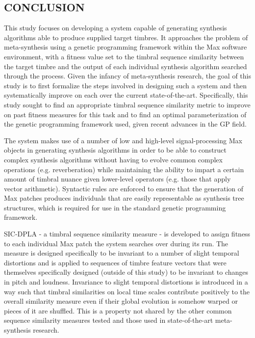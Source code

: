 \documentclass[12pt]{report} 	%
\numberwithin{figure}{chapter}
\numberwithin{table}{chapter}
\numberwithin{equation}{chapter}
\begin{document}
\begin{flushleft}
\vspace*{\QuarterPage}
\chapter{CONCLUSION} %
This study focuses on developing a system capable of generating synthesis algorithms able to produce supplied target timbres. It approaches the problem of meta-synthesis using a genetic programming framework within the Max software environment, with a fitness value set to the timbral sequence similarity between the target timbre and the output of each individual synthesis algorithm searched through the process. Given the infancy of meta-synthesis research, the goal of this study is to first formalize the steps involved in designing such a system and then systematically improve on each over the current state-of-the-art. Specifically, this study sought to find an appropriate timbral sequence similarity metric to improve on past fitness measures for this task and to find an optimal parameterization of the genetic programming framework used, given recent advances in the GP field.

The system makes use of a number of low and high-level signal-processing Max objects in generating synthesis algorithms in order to be able to construct complex synthesis algorithms without having to evolve common complex operations (e.g. reverberation) while maintaining the ability to impart a certain amount of timbral nuance given lower-level operators (e.g. those that apply vector arithmetic). Syntactic rules are enforced to ensure that the generation of Max patches produces individuals that are easily representable as synthesis tree structures, which is required for use in the standard genetic programming framework.

SIC-DPLA - a timbral sequence similarity measure - is developed to assign fitness to each individual Max patch the system searches over during its run. The measure is designed specifically to be invariant to a number of slight temporal distortions and is applied to sequences of timbre feature vectors that were themselves specifically designed (outside of this study) to be invariant to changes in pitch and loudness. Invariance to slight temporal distortions is introduced in a way such that timbral similarities on local time scales contribute positively to the overall similarity measure even if their global evolution is somehow warped or pieces of it are shuffled. This is a property not shared by the other common sequence similarity measures tested and those used in state-of-the-art meta-synthesis research.


\end{flushleft}
\end{document}
